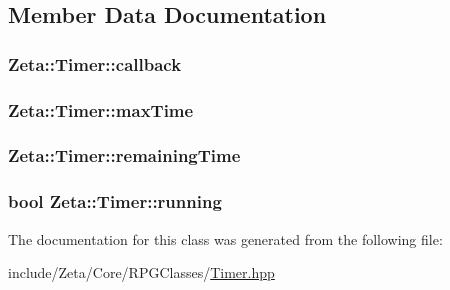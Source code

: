 \subsection{Member Data Documentation}
\hypertarget{classZeta_1_1Timer_a5c34b1ad2fbb002a4b107cc3658a5350}{
\subsubsection[{callback}]{ Zeta\+::\+Timer\+::callback\hspace{0.3cm}{\ttfamily [private]}}}\label{classZeta_1_1Timer_a5c34b1ad2fbb002a4b107cc3658a5350}
\hypertarget{classZeta_1_1Timer_a9a9cce102e64f634f3bcc1653f94d92f}{
\subsubsection[{max\+Time}]{ Zeta\+::\+Timer\+::max\+Time\hspace{0.3cm}{\ttfamily [private]}}}\label{classZeta_1_1Timer_a9a9cce102e64f634f3bcc1653f94d92f}
\hypertarget{classZeta_1_1Timer_a65a7dfa8c401787c7916a844b0c07965}{
\subsubsection[{remaining\+Time}]{ Zeta\+::\+Timer\+::remaining\+Time\hspace{0.3cm}{\ttfamily [private]}}}\label{classZeta_1_1Timer_a65a7dfa8c401787c7916a844b0c07965}
\hypertarget{classZeta_1_1Timer_a9d32f638022dbcfc33d30ca40aa8ede1}{
\subsubsection[{running}]{\setlength{\rightskip}{0pt plus 5cm}bool Zeta\+::\+Timer\+::running\hspace{0.3cm}{\ttfamily [private]}}}\label{classZeta_1_1Timer_a9d32f638022dbcfc33d30ca40aa8ede1}


The documentation for this class was generated from the following file\+:\begin{DoxyCompactItemize}
\item 
include/\+Zeta/\+Core/\+R\+P\+G\+Classes/\hyperlink{Timer_8hpp}{Timer.\+hpp}\end{DoxyCompactItemize}

